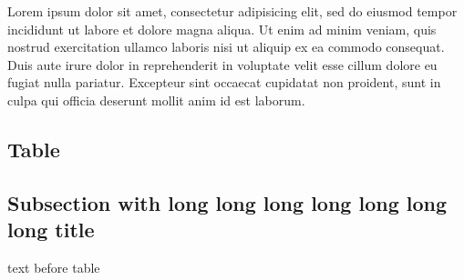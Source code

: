 \documentclass[10pt,a4paper,extrafontsizes,oldfontcommands,oneside]{memoir}
\begin{document}
Lorem ipsum dolor sit amet, consectetur adipisicing elit, sed do eiusmod tempor incididunt ut labore et dolore magna aliqua. Ut enim ad minim veniam, quis nostrud exercitation ullamco laboris nisi ut aliquip ex ea commodo consequat. Duis aute irure dolor in reprehenderit in voluptate velit esse cillum dolore eu fugiat nulla pariatur. Excepteur sint occaecat cupidatat non proident, sunt in culpa qui officia deserunt mollit anim id est laborum.


% 


\subsection{Table} %
\label{sub:table1}

\subsection{Subsection with long long long long long long long title} %
\label{sub:table}

text before table
\end{document}
